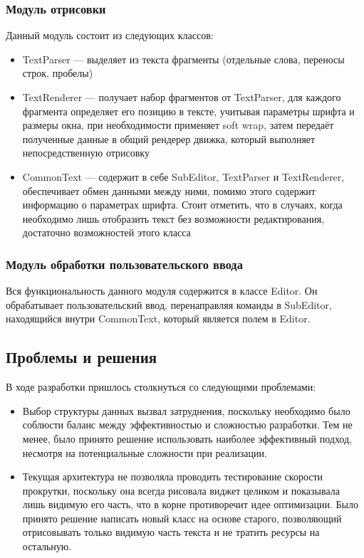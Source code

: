 \documentclass{fefu}
\begin{document}
			\subsubsection{Модуль отрисовки}
				\par Данный модуль состоит из следующих классов:
				\begin{itemize}
					\item TextParser --- выделяет из текста фрагменты (отдельные слова, 
					переносы строк, пробелы)
					\item TextRenderer --- получает набор фрагментов от TextParser, для каждого
					фрагмента определяет его позицию в тексте, учитывая параметры шрифта и 
					размеры окна, при необходимости применяет soft wrap, затем передаёт
					полученные данные в общий рендерер движка, который выполняет
					непосредственную отрисовку
					\item CommonText --- содержит в себе SubEditor, TextParser и TextRenderer,
					обеспечивает обмен данными между ними, помимо этого содержит информацию о
					параметрах шрифта. Стоит отметить, что в случаях, когда необходимо лишь 
					отобразить текст без возможности редактирования, достаточно возможностей
					этого класса
				\end{itemize}
			\subsubsection{Модуль обработки пользовательского ввода}
				\par Вся функциональность данного модуля содержится в классе Editor. Он
				обрабатывает пользовательский ввод, перенаправляя команды в SubEditor,
				находящийся внутри CommonText, который является полем в Editor.
		\subsection{Проблемы и решения}
			\par В ходе разработки пришлось столкнуться со следующими проблемами:
			\begin{itemize}
				\item Выбор структуры данных вызвал затруднения, поскольку необходимо было
				соблюсти баланс между эффективностью и сложностью разработки. Тем не менее,
				было принято решение использовать наиболее эффективный подход, несмотря на 
				потенциальные сложности при реализации.
				\item Текущая архитектура не позволяла проводить тестирование скорости 
				прокрутки, поскольку она всегда рисовала виджет целиком и показывала лишь 
				видимую его часть, что в корне противоречит идее оптимизации. Было принято
				решение написать новый класс на основе старого, позволяющий отрисовывать только
				видимую часть текста и не тратить ресурсы на остальную.
			\end{itemize}
\end{document}

